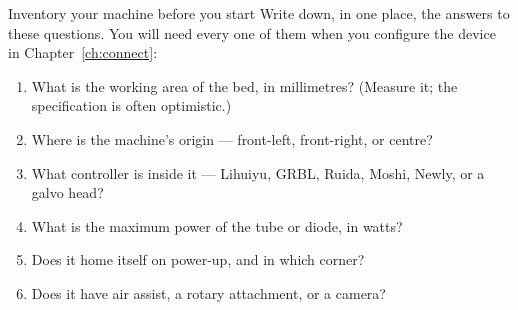 \begin{tryit}{Inventory your machine before you start}
Write down, in one place, the answers to these questions. You will need every
one of them when you configure the device in Chapter~\ref{ch:connect}:

\begin{enumerate}[label=\arabic*.,leftmargin=1.4em]
  \item What is the working area of the bed, in millimetres? (Measure it; the
        specification is often optimistic.)
  \item Where is the machine's origin --- front-left, front-right, or centre?
  \item What controller is inside it --- Lihuiyu, GRBL, Ruida, Moshi, Newly,
        or a galvo head?
  \item What is the maximum power of the tube or diode, in watts?
  \item Does it home itself on power-up, and in which corner?
  \item Does it have air assist, a rotary attachment, or a camera?
\end{enumerate}
\end{tryit}
